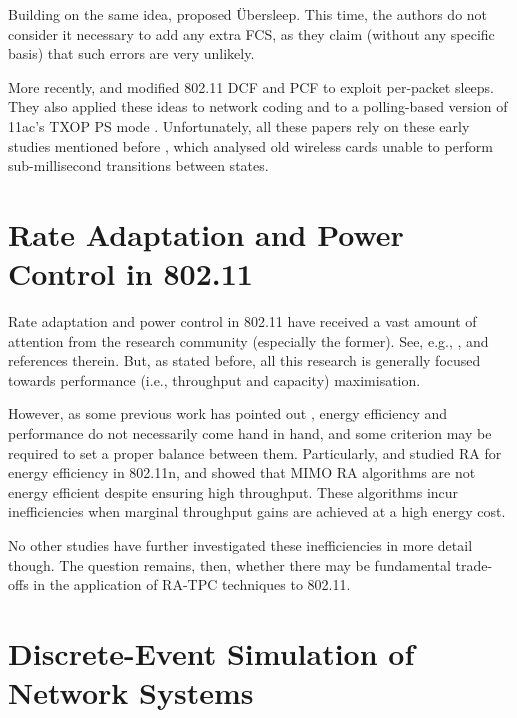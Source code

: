 \documentclass[twoside,nohyper]{tufte-book}
\theoremstyle{definition}
\theoremstyle{definition}
\theoremstyle{definition}
\theoremstyle{remark}
\begin{document}
Building on the same idea, \citet{Prasad2014} proposed Übersleep. This
time, the authors do not consider it necessary to add any extra FCS, as
they claim (without any specific basis) that such errors are very
unlikely.

More recently, \citet{palacios2013a} and \citet{palacios2013b} modified
802.11 DCF and PCF to exploit per-packet sleeps. They also applied these
ideas to network coding \citep{palacios2015b} and to a polling-based
version of 11ac's TXOP PS mode \citep{palacios2015a}. Unfortunately, all
these papers rely on these early studies mentioned before
\citep{kamerman1997, havinga2000, jung2002}, which analysed old wireless
cards unable to perform sub-millisecond transitions between states.

\hypertarget{rate-adaptation-and-power-control-in-802.11-1}{%
\section{Rate Adaptation and Power Control in
802.11}\label{rate-adaptation-and-power-control-in-802.11-1}}

Rate adaptation and power control in 802.11 have received a vast amount
of attention from the research community (especially the former). See,
e.g., \citet{biaz2008}, \citet{h-rca} and references therein. But, as
stated before, all this research is generally focused towards
performance (i.e., throughput and capacity) maximisation.

However, as some previous work has pointed out
\citep{tradeoff, balancing}, energy efficiency and performance do not
necessarily come hand in hand, and some criterion may be required to set
a proper balance between them. Particularly, \citet{Li2012} and
\citet{khan2013} studied RA for energy efficiency in 802.11n, and showed
that MIMO RA algorithms are not energy efficient despite ensuring high
throughput. These algorithms incur inefficiencies when marginal
throughput gains are achieved at a high energy cost.

No other studies have further investigated these inefficiencies in more
detail though. The question remains, then, whether there may be
fundamental trade-offs in the application of RA-TPC techniques to
802.11.

\hypertarget{discrete-event-simulation-of-network-systems}{%
\section{Discrete-Event Simulation of Network
Systems}\label{discrete-event-simulation-of-network-systems}}
\end{document}
